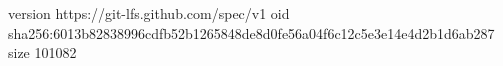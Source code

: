 version https://git-lfs.github.com/spec/v1
oid sha256:6013b82838996cdfb52b1265848de8d0fe56a04f6c12c5e3e14e4d2b1d6ab287
size 101082
